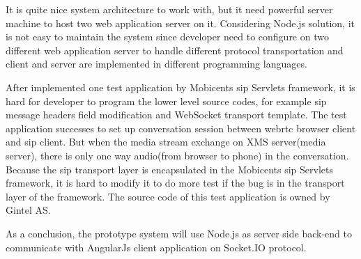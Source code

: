 \par It is quite nice system architecture to work with, but it need powerful server machine to host two web application server on it. Considering Node.js solution, it is not easy to maintain the system since developer need to configure on two different web application server to handle different protocol transportation and client and server are implemented in different programming languages.

\par After implemented one test application by Mobicents \gls{sip} Servlets framework, it is hard for developer to program the lower level source codes, for example \gls{sip} message headers field modification and WebSocket transport template. The test application successes to set up conversation session between \gls{webrtc} browser client and \gls{sip} client. But when the media stream exchange on XMS server(media server), there is only one way audio(from browser to phone) in the conversation. Because the \gls{sip} transport layer is encapsulated in the Mobicents \gls{sip} Servlets framework, it is hard to modify it to do more test if the bug is in the transport layer of the framework. The source code of this test application is owned by Gintel AS.

\par As a conclusion, the prototype system will use Node.js as server side back-end to communicate with AngularJs client application on Socket.IO protocol.